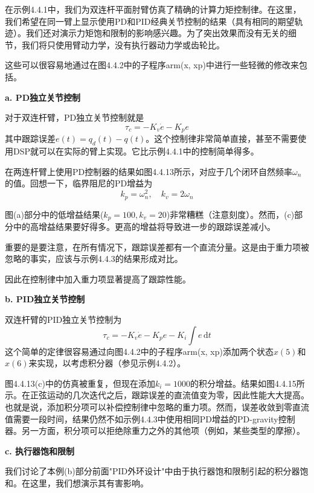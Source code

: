 \documentclass[UTF8]{ctexart}
\theoremstyle{definition}
\newcommand{\dd}{\mathrm{d}}
\begin{document}
\begin{examplebox}[示例4.4-4：经典关节控制和力矩饱和限制]
在示例4.4.1中，我们为双连杆平面肘臂仿真了精确的计算力矩控制律。在这里，我们希望在同一臂上显示使用PD和PID经典关节控制的结果（具有相同的期望轨迹）。我们还对演示力矩饱和限制的影响感兴趣。为了突出效果而没有无关的细节，我们将只使用臂动力学，没有执行器动力学或齿轮比。

这些可以很容易地通过在图4.4.2中的子程序arm(x, xp)中进行一些轻微的修改来包括。

\textbf{a. PD独立关节控制}

对于双连杆臂，PD独立关节控制就是
\begin{equation}
    \tau_c = -K_v\dot{e} - K_pe
\end{equation}
其中跟踪误差$e(t) = q_d(t) - q(t)$。这个控制律非常简单直接，甚至不需要使用DSP就可以在实际的臂上实现。它比示例4.4.1中的控制简单得多。

在两连杆臂上使用PD控制器的结果如图4.4.13所示，对应于几个闭环自然频率$\omega_n$的值。回想一下，临界阻尼的PD增益为
\begin{equation}
    k_p = \omega_n^2, \quad k_v = 2\omega_n
\end{equation}

图(a)部分中的低增益结果($k_p = 100, k_v = 20$)非常糟糕（注意刻度）。然而，(c)部分中的高增益结果要好得多。更高的增益将导致进一步的跟踪误差减小。

重要的是要注意，在所有情况下，跟踪误差都有一个直流分量。这是由于重力项被忽略的事实，应该与示例4.4.3的结果形成对比。

因此在控制律中加入重力项显著提高了跟踪性能。

\textbf{b. PID独立关节控制}

双连杆臂的PID独立关节控制为
\begin{equation}
    \tau_c = -K_v\dot{e} - K_pe - K_i\int e\,\dd t
\end{equation}
这个简单的定律很容易通过向图4.4.2中的子程序arm(x, xp)添加两个状态$x(5)$和$x(6)$来实现，以考虑积分器（参见示例4.4.2）。

图4.4.13(c)中的仿真被重复，但现在添加$k_i = 1000$的积分增益。结果如图4.4.15所示。在正弦运动的几次迭代之后，跟踪误差的直流值变为零，因此性能大大提高。也就是说，添加积分项可以补偿控制律中忽略的重力项。然而，误差收敛到零直流值需要一段时间，结果仍然不如示例4.4.3中使用相同PD增益的PD-gravity控制器。另一方面，积分项可以拒绝除重力之外的其他项（例如，某些类型的摩擦）。

\textbf{c. 执行器饱和限制}

我们讨论了本例(b)部分前面"PID外环设计"中由于执行器饱和限制引起的积分器饱和。在这里，我们想演示其有害影响。


\end{examplebox}
\end{document}
